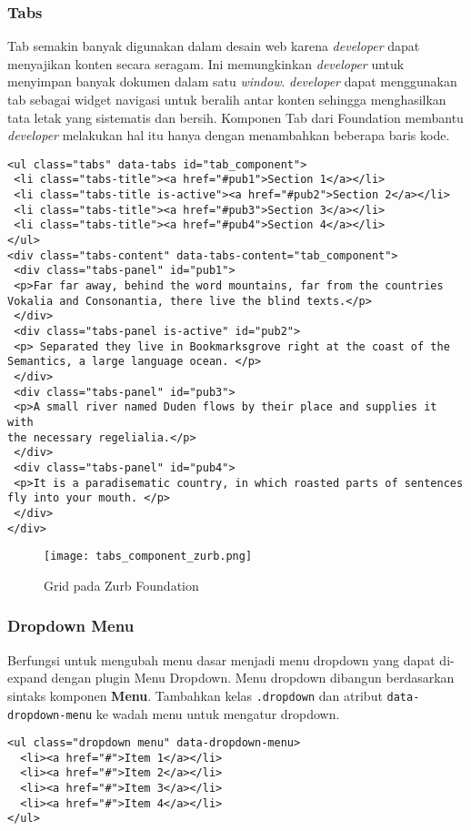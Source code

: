 \begin{enumerate}
\subsubsection{Tabs}
\label{subs:tabs_javascript_zurb}
Tab semakin banyak digunakan dalam desain web karena \textit{developer} dapat menyajikan konten secara seragam. Ini memungkinkan \textit{developer} untuk menyimpan banyak dokumen dalam satu \textit{window}. \textit{developer} dapat menggunakan tab sebagai widget navigasi untuk beralih antar konten sehingga menghasilkan tata letak yang sistematis dan bersih. Komponen Tab dari Foundation membantu \textit{developer} melakukan hal itu hanya dengan menambahkan beberapa baris kode. \cite{zurb:15:introfoundation}

\begin{lstlisting}[frame=single] 
<ul class="tabs" data-tabs id="tab_component">
 <li class="tabs-title"><a href="#pub1">Section 1</a></li>
 <li class="tabs-title is-active"><a href="#pub2">Section 2</a></li>
 <li class="tabs-title"><a href="#pub3">Section 3</a></li>
 <li class="tabs-title"><a href="#pub4">Section 4</a></li>
</ul>
<div class="tabs-content" data-tabs-content="tab_component">
 <div class="tabs-panel" id="pub1">
 <p>Far far away, behind the word mountains, far from the countries
Vokalia and Consonantia, there live the blind texts.</p>
 </div>
 <div class="tabs-panel is-active" id="pub2">
 <p> Separated they live in Bookmarksgrove right at the coast of the
Semantics, a large language ocean. </p>
 </div>
 <div class="tabs-panel" id="pub3">
 <p>A small river named Duden flows by their place and supplies it with
the necessary regelialia.</p>
 </div>
 <div class="tabs-panel" id="pub4">
 <p>It is a paradisematic country, in which roasted parts of sentences
fly into your mouth. </p>
 </div>
</div>
\end{lstlisting}

\begin{figure} [H]
	\centering  
	\texttt{[image: tabs\_component\_zurb.png]}  
	\caption{Grid pada Zurb Foundation}
	\label{fig:gridbasic_zurb} 
\end{figure}

\subsubsection{Dropdown Menu}
\label{subs:dropdown_javascript_zurb}
Berfungsi untuk mengubah menu dasar menjadi menu dropdown yang dapat di-expand dengan plugin Menu Dropdown.
Menu dropdown dibangun berdasarkan sintaks komponen \textbf{Menu}. Tambahkan kelas \texttt{.dropdown} dan atribut \texttt{data-dropdown-menu} ke wadah menu untuk mengatur dropdown. \cite{zurbfoundation:17}
\begin{lstlisting}[frame=single] 
<ul class="dropdown menu" data-dropdown-menu>
  <li><a href="#">Item 1</a></li>
  <li><a href="#">Item 2</a></li>
  <li><a href="#">Item 3</a></li>
  <li><a href="#">Item 4</a></li>
</ul>
\end{lstlisting}


\end{enumerate}
